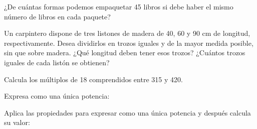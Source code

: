 \documentclass[spanish, 11pt]{exam}
\begin{document}
\begin{questions}
\begin{multicols}{2}
    
    \end{multicols}

    \question[1\half] ¿De cuántas formas podemos empaquetar 45 libros si debe haber el mismo número de libros en cada paquete?

    \question[2] Un carpintero dispone de tres listones de madera de 40, 60 y 90 cm de longitud, respectivamente. Desea dividirlos en trozos iguales y de la mayor medida posible, sin que sobre madera. ¿Qué longitud deben tener esos trozos? ¿Cuántos trozos iguales de cada listón se obtienen?

    \question[1\half] Calcula los múltiplos de 18 comprendidos entre 315 y 420.

\question[1] Expresa como una única potencia:
\begin{multicols}{3}
\end{multicols}

\question[1\half] Aplica las propiedades para expresar como una única potencia y después calcula su valor:
\begin{multicols}{2}
\end{multicols}
\end{questions}
\end{document}
